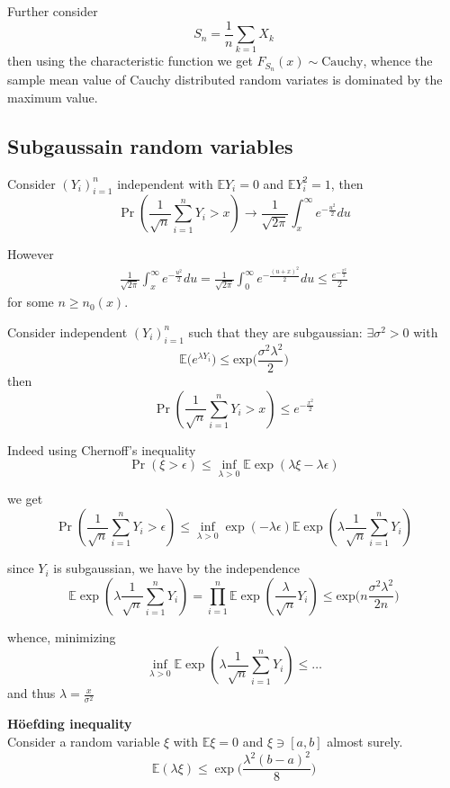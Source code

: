 \documentclass[a4paper]{article}
\newcommand{\clo}[1]{{\left [ #1 \right ]}}
\newcommand{\brac}[1]{{\left ( #1 \right )}}
\newcommand{\Ex}{\mathbb{E}}
\begin{document}
Further consider
\[S_n = \frac{1}{n}\sum_{k=1}X_k\]
then using the characteristic function we get $F_{S_n}(x) \sim \text{Cauchy}$, whence the sample mean value of Cauchy distributed random variates is dominated by the maximum value.

\subsection{Subgaussain random variables} %
\label{sub:subgaussain_random_variables}


Consider $\brac{Y_i}_{i=1}^n$  independent with $\Ex Y_i = 0$ and $\Ex Y_i^2 = 1$, then
\[\Pr\brac{ \frac{1}{\sqrt{n}}\sum_{i=1}^n Y_i > x } \to \frac{1}{\sqrt{2\pi}} \int_x^\infty e^{-\frac{u^2}{2}}du \]

However
\begin{align*}
	\frac{1}{\sqrt{2\pi}} \int_x^\infty e^{-\frac{u^2}{2}}du = \frac{1}{\sqrt{2\pi}} \int_0^\infty e^{-\frac{(u+x)^2}{2}}du \leq \frac{e^{-\frac{x^2}{2}}}{2}
\end{align*}
for some $n\geq n_0(x)$.

Consider independent $\brac{Y_i}_{i=1}^n$ such that they are subgaussian: $\exists \sigma^2 > 0$ with \[\Ex\big( e^{\lambda Y_i} \big) \leq \text{exp}\big( \frac{\sigma^2 \lambda^2}{2} \big)\]
then 
\[\Pr\brac{ \frac{1}{\sqrt{n}}\sum_{i=1}^n Y_i > x }\leq e^{-\frac{x^2}{2}}\]

Indeed using Chernoff's inequality
\[\Pr\brac{\xi>\epsilon}\leq \inf_{\lambda>0} \Ex\exp\brac{\lambda\xi - \lambda\epsilon}\]

we get
\[\Pr\brac{\frac{1}{\sqrt{n}}\sum_{i=1}^n Y_i>\epsilon}\leq \inf_{\lambda>0} \exp\brac{ - \lambda\epsilon} \Ex\exp\brac{\lambda\frac{1}{\sqrt{n}}\sum_{i=1}^n Y_i}\]

since $Y_i$ is subgaussian, we have by the independence
\[\Ex\exp\brac{\lambda\frac{1}{\sqrt{n}}\sum_{i=1}^n Y_i} = 
\prod_{i=1}^n \Ex\exp\brac{\frac{\lambda}{\sqrt{n}} Y_i} \leq 
\text{exp}\big( n \frac{\sigma^2 \lambda^2}{2n} \big)
\]

whence, minimizing
\[\inf_{\lambda>0} \Ex\exp\brac{\lambda\frac{1}{\sqrt{n}}\sum_{i=1}^n Y_i} \leq \ldots\]
and thus $\lambda = \frac{x}{\sigma^2}$

\noindent\textbf{H\"oefding inequality}\hfill\\
Consider a random variable $\xi$ with $\Ex \xi = 0$ and $\xi\ni\clo{a,b}$ almost surely.
\[\Ex\brac{\lambda \xi}\leq \exp\big( \frac{\lambda^2(b-a)^2}{8} \big)\]
\end{document}

